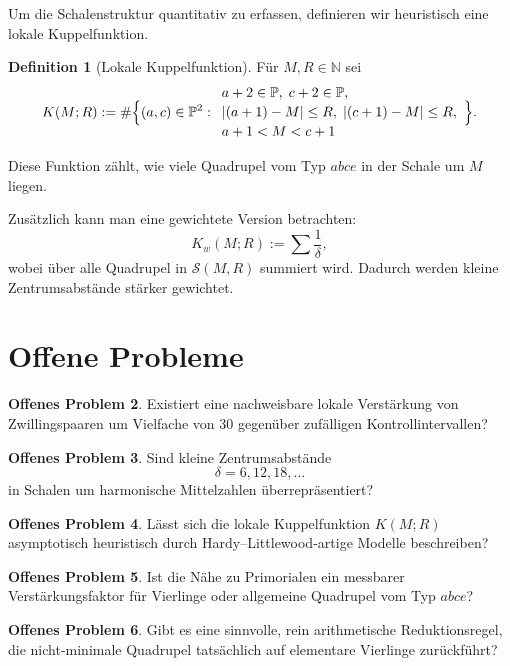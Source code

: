 \documentclass[11pt,a4paper]{article}
\theoremstyle{definition}
\newtheorem{definition}{Definition}[section]
\newtheorem{problem}[definition]{Offenes Problem}
\theoremstyle{plain}
\theoremstyle{remark}
\newcommand{\N}{\mathbb{N}}
\newcommand{\pp}{\mathbb{P}}
\newcommand{\abs}[1]{\left|#1\right|}
\begin{document}
	Um die Schalenstruktur quantitativ zu erfassen, definieren wir heuristisch eine lokale Kuppelfunktion.
	
	\begin{definition}[Lokale Kuppelfunktion]
		Für $M,R\in\N$ sei
		\[
		K(M;R):=\#\Bigl\{(a,c)\in\pp^2:
		\begin{array}{l}
			a+2\in\pp,\; c+2\in\pp,\\[0.2em]
			\abs{(a+1)-M}\le R,\;
			\abs{(c+1)-M}\le R,\\[0.2em]
			a+1 < M < c+1
		\end{array}
		\Bigr\}.
		\]
	\end{definition}
	
	Diese Funktion zählt, wie viele Quadrupel vom Typ $abce$ in der Schale um $M$ liegen.
	
	Zusätzlich kann man eine gewichtete Version betrachten:
	\[
	K_w(M;R):=\sum \frac{1}{\delta},
	\]
	wobei über alle Quadrupel in $\mathcal S(M,R)$ summiert wird. 
	Dadurch werden kleine Zentrumsabstände stärker gewichtet.
	
	\section{Offene Probleme}
	
	\begin{problem}
		Existiert eine nachweisbare lokale Verstärkung von Zwillingspaaren um Vielfache von $30$ gegenüber zufälligen Kontrollintervallen?
	\end{problem}
	
	\begin{problem}
		Sind kleine Zentrumsabstände
		\[
		\delta=6,12,18,\dots
		\]
		in Schalen um harmonische Mittelzahlen überrepräsentiert?
	\end{problem}
	
	\begin{problem}
		Lässt sich die lokale Kuppelfunktion $K(M;R)$ asymptotisch heuristisch durch Hardy--Littlewood-artige Modelle beschreiben?
	\end{problem}
	
	\begin{problem}
		Ist die Nähe zu Primorialen ein messbarer Verstärkungsfaktor für Vierlinge oder allgemeine Quadrupel vom Typ $abce$?
	\end{problem}
	
	\begin{problem}
		Gibt es eine sinnvolle, rein arithmetische Reduktionsregel, die nicht-minimale Quadrupel tatsächlich auf elementare Vierlinge zurückführt?
	\end{problem}
\end{document}
